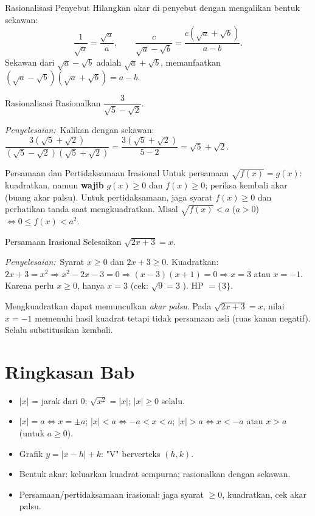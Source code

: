 \documentclass[11pt,a4paper]{report}
\theoremstyle{gaya}
\newcommand{\jawab}{\par\smallskip\noindent\textit{\textcolor{oranye}{Penyelesaian:}}\ }
\begin{document}
\begin{konsep}{Rasionalisasi Penyebut}
Hilangkan akar di penyebut dengan mengalikan bentuk sekawan:
\[
\frac{1}{\sqrt a}=\frac{\sqrt a}{a},\qquad
\frac{c}{\sqrt a-\sqrt b}=\frac{c(\sqrt a+\sqrt b)}{a-b}.
\]
Sekawan dari $\sqrt a-\sqrt b$ adalah $\sqrt a+\sqrt b$, memanfaatkan $(\sqrt a-\sqrt b)(\sqrt a+\sqrt b)=a-b$.
\end{konsep}

\begin{contoh}{Rasionalisasi}
Rasionalkan $\dfrac{3}{\sqrt5-\sqrt2}$.

\jawab Kalikan dengan sekawan: $\dfrac{3(\sqrt5+\sqrt2)}{(\sqrt5-\sqrt2)(\sqrt5+\sqrt2)}=\dfrac{3(\sqrt5+\sqrt2)}{5-2}=\sqrt5+\sqrt2.$
\end{contoh}

\begin{konsep}{Persamaan dan Pertidaksamaan Irasional}
Untuk persamaan $\sqrt{f(x)}=g(x)$: kuadratkan, namun \textbf{wajib} $g(x)\ge0$ dan $f(x)\ge0$; periksa kembali akar (buang akar palsu). Untuk pertidaksamaan, jaga syarat $f(x)\ge0$ dan perhatikan tanda saat mengkuadratkan. Misal $\sqrt{f(x)}<a$ ($a>0$) $\iff 0\le f(x)<a^2$.
\end{konsep}

\begin{contoh}{Persamaan Irasional}
Selesaikan $\sqrt{2x+3}=x$.

\jawab Syarat $x\ge0$ dan $2x+3\ge0$. Kuadratkan: $2x+3=x^2\Rightarrow x^2-2x-3=0\Rightarrow(x-3)(x+1)=0\Rightarrow x=3$ atau $x=-1$. Karena perlu $x\ge0$, hanya $x=3$ (cek: $\sqrt9=3$ \checkmark). HP $=\{3\}$.
\end{contoh}

\begin{kesalahan}
Mengkuadratkan dapat memunculkan \emph{akar palsu}. Pada $\sqrt{2x+3}=x$, nilai $x=-1$ memenuhi hasil kuadrat tetapi tidak persamaan asli (ruas kanan negatif). Selalu substitusikan kembali.
\end{kesalahan}

\section*{Ringkasan Bab}
\begin{itemize}[leftmargin=*,topsep=2pt]
  \item $|x|$ = jarak dari $0$; $\sqrt{x^2}=|x|$; $|x|\ge0$ selalu.
  \item $|x|=a\iff x=\pm a$; $|x|<a\iff -a<x<a$; $|x|>a\iff x<-a$ atau $x>a$ (untuk $a\ge0$).
  \item Grafik $y=|x-h|+k$: "V" berverteks $(h,k)$.
  \item Bentuk akar: keluarkan kuadrat sempurna; rasionalkan dengan sekawan.
  \item Persamaan/pertidaksamaan irasional: jaga syarat $\ge0$, kuadratkan, cek akar palsu.
\end{itemize}
\end{document}
